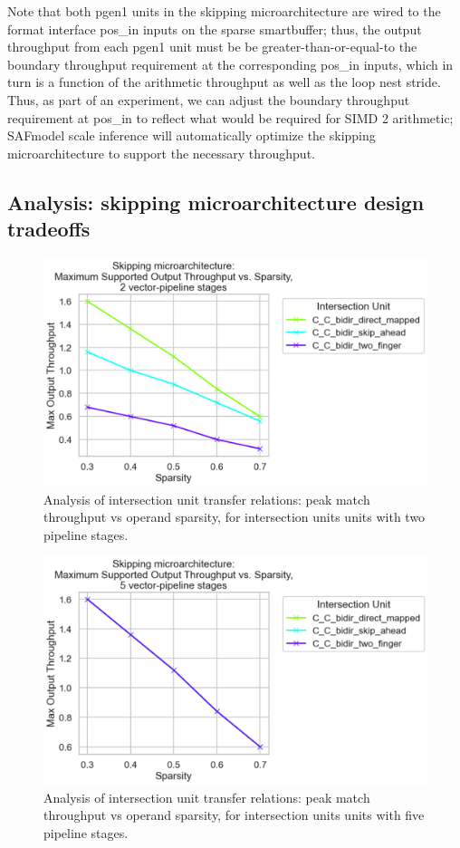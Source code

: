 Note that both pgen1 units in the skipping microarchitecture are wired to the format interface pos\_in inputs on the sparse smartbuffer; thus, the output throughput from each pgen1 unit must be be greater-than-or-equal-to the boundary throughput requirement at the corresponding pos\_in inputs, which in turn is a function of the arithmetic throughput as well as the loop nest stride. Thus, as part of an experiment, we can adjust the boundary throughput requirement at pos\_in to reflect what would be required for SIMD 2 arithmetic; SAFmodel scale inference will automatically optimize the skipping microarchitecture to support the necessary throughput.

\subsection{Analysis: skipping microarchitecture design tradeoffs}

\begin{figure}[H]
\includegraphics[width=\textwidth]{figures/skip_uarch_pipe_2.png}
\caption{Analysis of intersection unit transfer relations: peak match throughput vs operand sparsity, for intersection units units with two pipeline stages.}
\label{fig:skip_uarch_pipe_2}
\end{figure}

\begin{figure}[H]
\includegraphics[width=\textwidth]{figures/skip_uarch_pipe_5.png}
\caption{Analysis of intersection unit transfer relations: peak match throughput vs operand sparsity, for intersection units units with five pipeline stages.}
\label{fig:skip_uarch_pipe_5}
\end{figure}

